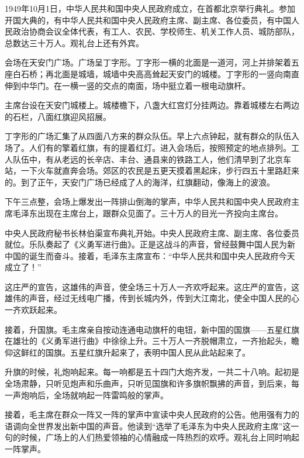 \documentclass[12pt,UTF-8,openany]{ctexbook}
\begin{document}
\begin{Large}
    
    1949年10月1日，中华人民共和国中央人民政府成立，在首都北京举行典礼。参加开国大典的，有中华人民共和国中央人民政府主席、副主席、各位委员，有中国人民政治协商会议全体代表，有工人、农民、学校师生、机关工作人员、城防部队，总数达三十万人。观礼台上还有外宾。
    
    会场在天安门广场。广场呈丁字形。丁字形一横的北面是一道河，河上并排架着五座白石桥；再北面是城墙，城墙中央高高耸起天安门的城楼。丁字形的一竖向南直伸到中华门。在一横一竖的交点的南面，场中挺立着一根电动旗杆。
    
    主席台设在天安门城楼上。城楼檐下，八盏大红宫灯分挂两边。靠着城楼左右两边的石栏，八面红旗迎风招展。
    
    丁字形的广场汇集了从四面八方来的群众队伍。早上六点钟起，就有群众的队伍入场了。人们有的擎着红旗，有的提着红灯。进入会场后，按照预定的地点排列。工人队伍中，有从老远的长辛店、丰台、通县来的铁路工人，他们清早到了北京车站，一下火车就直奔会场。郊区的农民是五更天摸着黑起床，步行四五十里路赶来的。到了正午，天安门广场已经成了人的海洋，红旗翻动，像海上的波浪。
    
    下午三点整，会场上爆发出一阵排山倒海的掌声，中华人民共和国中央人民政府主席毛泽东出现在主席台上，跟群众见面了。三十万人的目光一齐投向主席台。
    
    中央人民政府秘书长林伯渠宣布典礼开始。中央人民政府主席、副主席、各位委员就位。乐队奏起了《义勇军进行曲》。正是这战斗的声音，曾经鼓舞中国人民为新中国的诞生而奋斗。接着，毛泽东主席宣布：“中华人民共和国中央人民政府今天成立了！”
    
    这庄严的宣告，这雄伟的声音，使全场三十万人一齐欢呼起来。这庄严的宣告，这雄伟的声音，经过无线电广播，传到长城内外，传到大江南北，使全中国人民的心一齐欢跃起来。
    
    接着，升国旗。毛主席亲自按动连通电动旗杆的电钮，新中国的国旗——五星红旗在雄壮的《义勇军进行曲》中徐徐上升。三十万人一齐脱帽肃立，一齐抬起头，瞻仰这鲜红的国旗。五星红旗升起来了，表明中国人民从此站起来了。
    
    升旗的时候，礼炮响起来。每一响都是五十四门大炮齐发，一共二十八响。起初是全场肃静，只听见炮声和乐曲声，只听见国旗和许多旗帜飘拂的声音，到后来，每一声炮响后，全场就响起一阵雷鸣般的掌声。
    
    接着，毛主席在群众一阵又一阵的掌声中宣读中央人民政府的公告。他用强有力的语调向全世界发出新中国的声音。他读到“选举了毛泽东为中央人民政府主席”这一句的时候，广场上的人们热爱领袖的心情融成一阵热烈的欢呼。观礼台上同时响起一阵掌声。
    

\end{Large}
\end{document}
